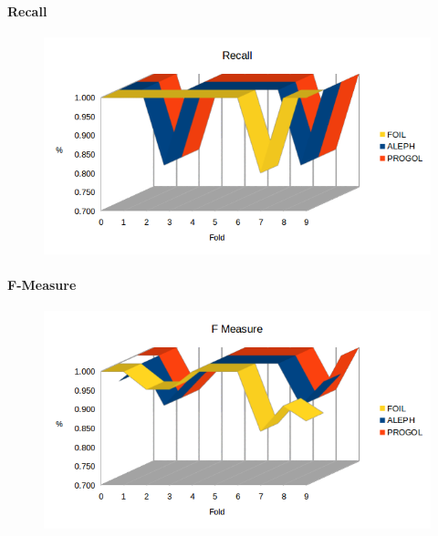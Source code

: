 \paragraph{Recall}
\begin{figure}[H]
	\includegraphics[width=1.1\textwidth]{img/datasetGraph/jmlr/recall.png}
	\label{JMLR-Recall}
\end{figure}

\paragraph{F-Measure}
\begin{figure}[H]
	\includegraphics[width=1.1\textwidth]{img/datasetGraph/jmlr/fm.png}
	\label{JMLR-F-measure}
\end{figure}

